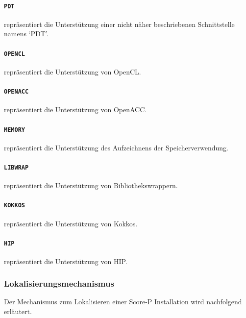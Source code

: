\documentclass[german,proseminar,hyperref,utf8,lof]{zihpub}
\begin{document}
    \paragraph{\texttt{PDT}} repräsentiert die Unterstützung einer nicht näher beschriebenen Schnittstelle
    namens `PDT'.

    \paragraph{\texttt{OPENCL}} repräsentiert die Unterstützung von OpenCL.

    \paragraph{\texttt{OPENACC}} repräsentiert die Unterstützung von OpenACC.

    \paragraph{\texttt{MEMORY}} repräsentiert die Unterstützung des Aufzeichnens der Speicherverwendung.

    \paragraph{\texttt{LIBWRAP}} repräsentiert die Unterstützung von Bibliothekswrappern.

    \paragraph{\texttt{KOKKOS}} repräsentiert die Unterstützung von Kokkos.

    \paragraph{\texttt{HIP}} repräsentiert die Unterstützung von HIP.

    \subsubsection{Lokalisierungsmechanismus}
    Der Mechanismus zum Lokalisieren einer Score-P Installation wird nachfolgend erläutert.
\end{document}

